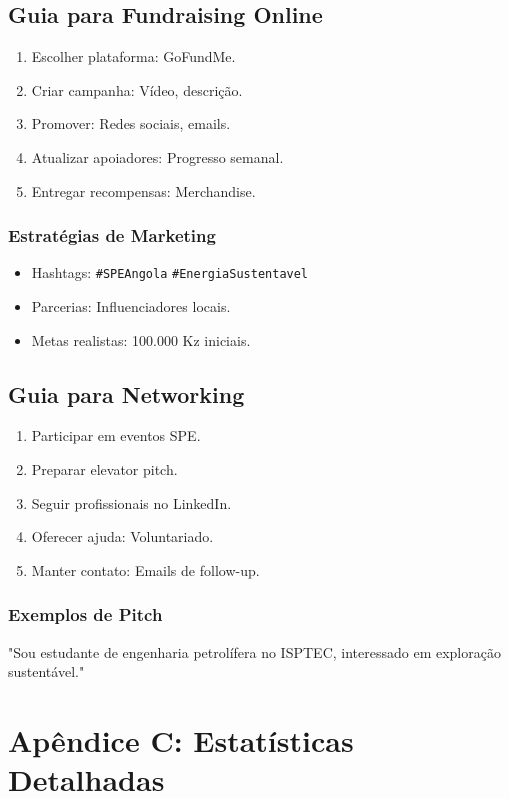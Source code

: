 \documentclass[12pt]{article}
\begin{document}
\subsection{Guia para Fundraising Online}
\begin{enumerate}
    \item Escolher plataforma: GoFundMe.
    \item Criar campanha: Vídeo, descrição.
    \item Promover: Redes sociais, emails.
    \item Atualizar apoiadores: Progresso semanal.
    \item Entregar recompensas: Merchandise.
\end{enumerate}

\subsubsection{Estratégias de Marketing}
\begin{itemize}
    \item Hashtags: \verb|#SPEAngola| \verb|#EnergiaSustentavel|
    \item Parcerias: Influenciadores locais.
    \item Metas realistas: 100.000 Kz iniciais.
\end{itemize}

\subsection{Guia para Networking}
\begin{enumerate}
    \item Participar em eventos SPE.
    \item Preparar elevator pitch.
    \item Seguir profissionais no LinkedIn.
    \item Oferecer ajuda: Voluntariado.
    \item Manter contato: Emails de follow-up.
\end{enumerate}

\subsubsection{Exemplos de Pitch}
"Sou estudante de engenharia petrolífera no ISPTEC, interessado em exploração sustentável."

\clearpage
\section{Apêndice C: Estatísticas Detalhadas}
\end{document}
